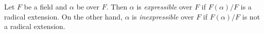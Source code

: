 \documentclass[12pt]{article}
\begin{document}
Let $F$ be a field and $\alpha$ be  over $F$.  Then $\alpha$ is \emph{expressible} over $F$ if $F(\alpha)/F$ is a radical extension.  On the other hand, $\alpha$ is \emph{inexpressible} over $F$ if $F(\alpha)/F$ is not a radical extension.
\end{document}
